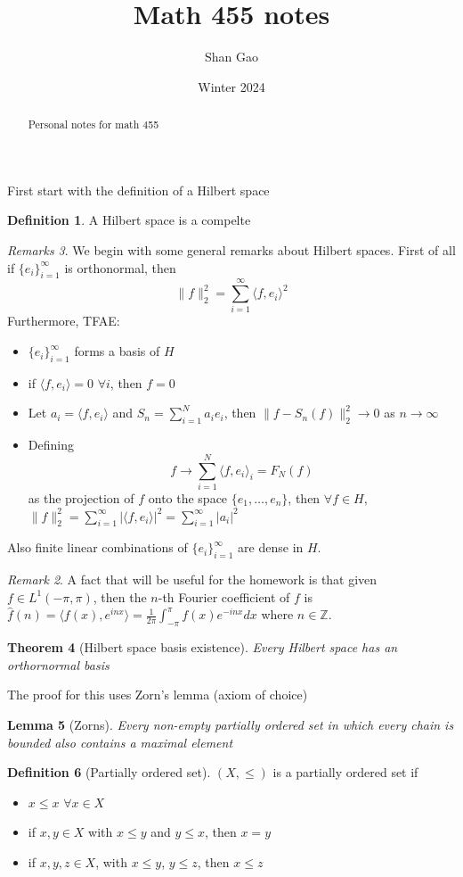 \documentclass[13pt]{article}
\title{Math 455 notes}
\author{Shan Gao}
\date{Winter 2024}  %
\newtheorem{theorem}{Theorem}
\newtheorem{lemma}[theorem]{Lemma}
\theoremstyle{definition}
\newtheorem{definition}[theorem]{Definition}
\theoremstyle{remark}
\newtheorem{remark}[theorem]{Remark}
\newtheorem{remarks}[theorem]{Remarks}
\begin{document}
\maketitle
\begin{abstract}
    Personal notes for math 455
\end{abstract}
First start with the definition of a Hilbert space
\begin{definition}
	A Hilbert space is a compelte 
\end{definition}
\begin{remarks}
    We begin with some general remarks about Hilbert spaces. First of all if $\{e_i\}_{i=1}^\infty$ is orthonormal, then 
    $$\|f\|_2^2 = \sum_{i=1}^\infty \langle f, e_i \rangle^2$$
    Furthermore, TFAE: 
    \begin{itemize}
        \item $\{e_i\}_{i=1}^\infty$ forms a basis of $H$
        \item if $\langle f,e_i \rangle = 0$ $\forall i$, then $f = 0$
        \item Let $a_i = \langle f, e_i \rangle$ and $S_n = \sum_{i=1}^N a_i e_i$, then $\|f - S_n(f)\|_2^2 \to 0$ as $n \to \infty$
        \item Defining
        $$ f \to \sum_{i=1}^N \langle f, e_i \rangle_i = F_N(f)$$ as the projection of $f$ onto the space $\{e_1,\ldots,e_n\}$, then $\forall f \in H$, $\|f\|_2^2 = \sum_{i=1}^\infty |\langle f, e_i \rangle|^2 = \sum_{i=1}^\infty |a_i|^2$
    \end{itemize}
    Also finite linear combinations of $\{e_i\}_{i=1}^\infty$ are dense in $H$.
\begin{remark}
    A fact that will be useful for the homework is that given $f \in L^1(-\pi, \pi)$, then the $n$-th Fourier coefficient of $f$ is $\hat{f}(n) = \langle f(x),e^{inx} \rangle = \frac{1}{2\pi} \int_{-\pi}^\pi f(x)e^{-inx}dx$ where $n \in \mathbb{Z}$.
\end{remark}
\end{remarks}

\begin{theorem}[Hilbert space basis existence] \label{thm:1}
    Every Hilbert space has an orthornormal basis
\end{theorem}
The proof for this uses Zorn's lemma (axiom of choice)
\begin{lemma}[Zorns]
    Every non-empty partially ordered set in which every chain is bounded also contains a maximal element
\end{lemma}
\begin{definition}[Partially ordered set]
    $(X, \leq)$ is a partially ordered set if 
    \begin{itemize}
        \item $x \leq x$ $\forall x \in X$
        \item if $x,y \in X$ with $x \leq y$ and $y \leq x$, then $x = y$
        \item if $x,y,z \in X$, with $x \leq y$, $y \leq z$, then $x \leq z$
    \end{itemize}
    
\end{definition}
\end{document}

